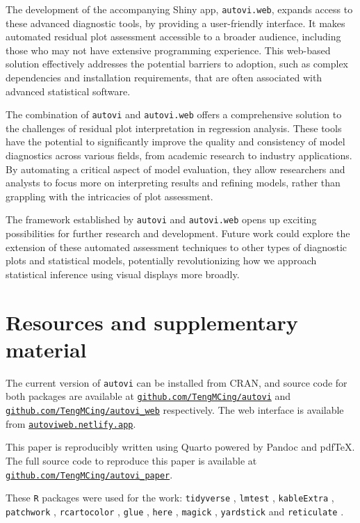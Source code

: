 \documentclass[
doublespace,
  times]{anzsauth}
\begin{document}
The development of the accompanying Shiny app, \texttt{autovi.web},
expands access to these advanced diagnostic tools, by providing a
user-friendly interface. It makes automated residual plot assessment
accessible to a broader audience, including those who may not have
extensive programming experience. This web-based solution effectively
addresses the potential barriers to adoption, such as complex
dependencies and installation requirements, that are often associated
with advanced statistical software.

The combination of \texttt{autovi} and \texttt{autovi.web} offers a
comprehensive solution to the challenges of residual plot interpretation
in regression analysis. These tools have the potential to significantly
improve the quality and consistency of model diagnostics across various
fields, from academic research to industry applications. By automating a
critical aspect of model evaluation, they allow researchers and analysts
to focus more on interpreting results and refining models, rather than
grappling with the intricacies of plot assessment.

The framework established by \texttt{autovi} and \texttt{autovi.web}
opens up exciting possibilities for further research and development.
Future work could explore the extension of these automated assessment
techniques to other types of diagnostic plots and statistical models,
potentially revolutionizing how we approach statistical inference using
visual displays more broadly.

\section{Resources and supplementary
material}\label{resources-and-supplementary-material}

The current version of \texttt{autovi} can be installed from CRAN, and
source code for both packages are available at
\href{https://github.com/TengMCing/autovi}{\texttt{github.com/TengMCing/autovi}}
and
\href{https://github.com/TengMCing/autovi_web}{\texttt{github.com/TengMCing/autovi\_web}}
respectively. The web interface is available from
\href{https://autoviweb.netlify.app/}{\texttt{autoviweb.netlify.app}}.

This paper is reproducibly written using Quarto
\citep{Allaire_Quarto_2024} powered by Pandoc \citep{MacFarlane_Pandoc}
and pdfTeX. The full source code to reproduce this paper is available at
\href{https://github.com/TengMCing/autovi_paper}{\texttt{github.com/TengMCing/autovi\_paper}}.

These \texttt{R} packages were used for the work: \texttt{tidyverse}
\citep{tidyverse}, \texttt{lmtest} \citep{lmtest}, \texttt{kableExtra}
\citep{kableextra}, \texttt{patchwork} \citep{patchwork},
\texttt{rcartocolor} \citep{rcartocolor}, \texttt{glue} \citep{glue},
\texttt{here} \citep{here}, \texttt{magick} \citep{magick},
\texttt{yardstick} \citep{yardstick} and \texttt{reticulate}
\citep{reticulate}.



\end{document}
